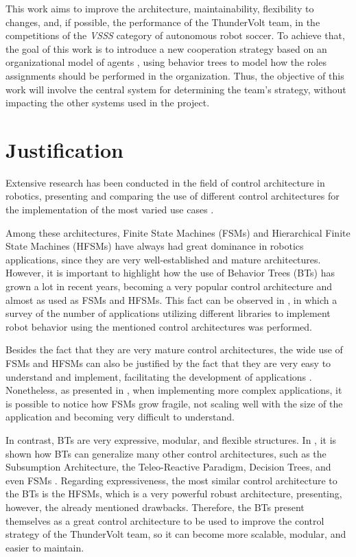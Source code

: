 This work aims to improve the architecture, maintainability, flexibility to changes, and, if possible, the performance of the ThunderVolt team, in the competitions of the \textit{VSSS} category of autonomous robot soccer. To achieve that, the goal of this work is to introduce a new cooperation strategy based on an organizational model of agents \cite{Moise}, using behavior trees to model how the roles assignments should be performed in the organization. Thus, the objective of this work will involve the central system for determining the team's strategy, without impacting the other systems used in the project.

\section{Justification}

Extensive research has been conducted in the field of control architecture in robotics, presenting and comparing the use of different control architectures for the implementation of the most varied use cases \cite{BTsInRobotics, SurveyBTs, Expressiveness, iovino2022programming, RobotArchitectureInDynamicEnvironment, PetriNetsRobotics, billington2010plausible, BTsAndFSMApplications}.

Among these architectures, Finite State Machines (FSMs) and Hierarchical Finite State Machines (HFSMs) have always had great dominance in robotics applications, since they are very well-established and mature architectures. However, it is important to highlight how the use of Behavior Trees (BTs) has grown a lot in recent years, becoming a very popular control architecture and almost as used as FSMs and HFSMs. This fact can be observed in \cite{BTsAndFSMApplications}, in which a survey of the number of applications utilizing different libraries to implement robot behavior using the mentioned control architectures was performed.

Besides the fact that they are very mature control architectures, the wide use of FSMs and HFSMs can also be justified by the fact that they are very easy to understand and implement, facilitating the development of applications \cite{BTsInRobotics, Expressiveness, iovino2022programming}. Nonetheless, as presented in \cite{BTsInRobotics, SurveyBTs, iovino2022programming}, when implementing more complex applications, it is possible to notice how FSMs grow fragile, not scaling well with the size of the application and becoming very difficult to understand.

In contrast, BTs are very expressive, modular, and flexible structures. In \cite{BTsInRobotics}, it is shown how BTs can generalize many other control architectures, such as the Subsumption Architecture, the Teleo-Reactive Paradigm, Decision Trees, and even FSMs \cite{BTsInRobotics, Expressiveness,  iovino2022programming}. Regarding expressiveness, the most similar control architecture to the BTs is the HFSMs, which is a very powerful robust architecture, presenting, however, the already mentioned drawbacks. Therefore, the BTs present themselves as a great control architecture to be used to improve the control strategy of the ThunderVolt team, so it can become more scalable, modular, and easier to maintain.

